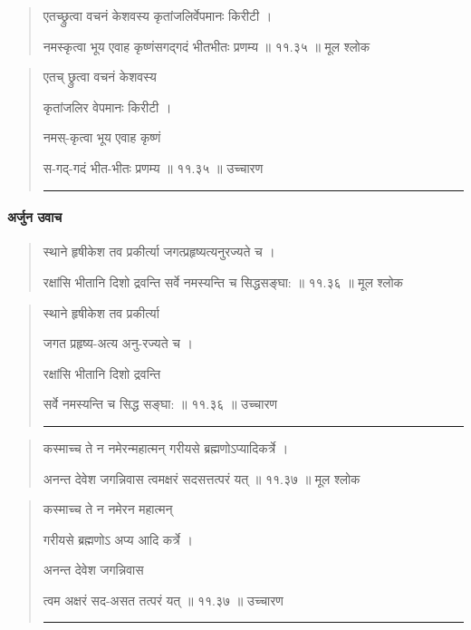 \begin{quotation} 


एतच्छ्रुत्वा वचनं केशवस्य कृतांजलिर्वेपमानः किरीटी  ।  

नमस्कृत्वा भूय एवाह कृष्णंसगद्गदं भीतभीतः प्रणम्य  ॥ ११.३५ ॥  मूल श्लोक
\end{quotation}

\begin{quotation}

एतच् छ्रुत्वा वचनं केशवस्य 

कृतांजलिर वेपमानः किरीटी  ।  

नमस्-कृत्वा भूय एवाह कृष्णं

स-गद्-गदं  भीत-भीतः प्रणम्य  ॥ ११.३५ ॥  उच्चारण

\noindent\rule{16cm}{0.4pt} 
\end{quotation}






\paragraph{\sanskrit अर्जुन उवाच}
\begin{quotation} 
स्थाने हृषीकेश तव प्रकीर्त्या जगत्प्रहृष्यत्यनुरज्यते च  ।  

रक्षांसि भीतानि दिशो द्रवन्ति सर्वे नमस्यन्ति च सिद्धसङ्‍घा:  ॥ ११.३६ ॥  मूल श्लोक
\end{quotation}

\begin{quotation}

स्थाने हृषीकेश तव प्रकीर्त्या

जगत  प्रहृष्य-अत्य अनु-रज्यते च  ।  

रक्षांसि भीतानि दिशो द्रवन्ति 

सर्वे नमस्यन्ति च सिद्ध सङ्‍घा:  ॥ ११.३६ ॥  उच्चारण

\noindent\rule{16cm}{0.4pt} 
\end{quotation}


\begin{quotation} 

कस्माच्च ते न नमेरन्महात्मन्‌ गरीयसे ब्रह्मणोऽप्यादिकर्त्रे  ।  

अनन्त देवेश जगन्निवास त्वमक्षरं सदसत्तत्परं यत्‌  ॥ ११.३७ ॥  मूल श्लोक
\end{quotation}

\begin{quotation}

कस्माच्च ते न नमेरन महात्मन्‌ 

गरीयसे ब्रह्मणोऽ अप्य आदि कर्त्रे ।  

अनन्त देवेश जगन्निवास 

त्वम अक्षरं सद-असत तत्परं यत्‌  ॥ ११.३७ ॥  उच्चारण

\noindent\rule{16cm}{0.4pt} 
\end{quotation}


